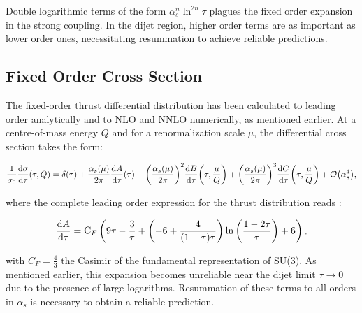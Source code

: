 \documentclass[../Tesi_Jiahao_Miao_986136.tex]{subfiles}
\begin{document}

Double logarithmic terms of the form $\alpha_s^n \ln^{2n}\tau$ plagues the fixed order expansion in the strong coupling. In the dijet region, higher order 
terms are as important as lower order ones, necessitating resummation to achieve reliable predictions.

\subsection{Fixed Order Cross Section}

The fixed-order thrust differential distribution has been calculated to leading order analytically and
to NLO and NNLO numerically, as mentioned earlier. At a centre-of-mass energy $Q$ and for a renormalization scale $\mu$, the differential cross section takes the form:

\begin{equation}\label{eq:Fixed_order}
    \frac{1}{\sigma_0} \dv{\sigma}{\tau} \qty(\tau,Q) = \delta(\tau) + \frac{\alpha_s(\mu)}{2\pi}\dv{A}{\tau} \qty(\tau) + \qty(\frac{\alpha_s(\mu)}{2\pi})^2 \dv{B}{\tau} \qty(\tau,\frac{\mu}{Q}) + \qty(\frac{\alpha_s(\mu)}{2\pi})^3 \dv{C}{\tau} \qty(\tau,\frac{\mu}{Q}) + \order{\alpha_s^4} ,
\end{equation}

where the complete leading order expression for the thrust distribution reads \cite{Ellis:1980wv}:

\begin{equation}\label{eq:Fixed_order_A}
    \dv{A}{\tau}(\tau) =  \text{C}_F \left(9 \tau -\frac{3}{\tau }+\left(-6 +\frac{4}{(1-\tau ) \tau }\right) \ln \left(\frac{1-2 \tau }{\tau }\right)+6\right),
\end{equation}

with $C_F = \frac{4}{3}$ the Casimir of the fundamental representation of SU(3). As mentioned earlier, this expansion becomes unreliable near the dijet limit $\tau \to 0$ due to the presence of large logarithms.
Resummation of these terms to all orders in $\alpha_s$ is necessary to obtain a reliable prediction.
\end{document}
